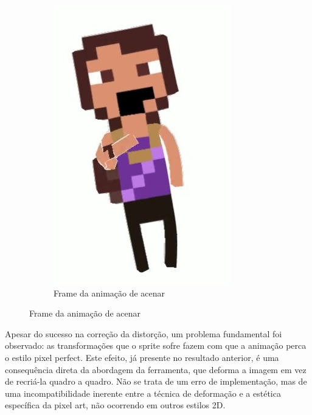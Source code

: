 \begin{figure}[htbp]
\begin{subfigure}{0.2\linewidth}
        \includegraphics[width=1\linewidth]{figs/sketchLab/irma2_frame4.jpg}
        \caption{\small Frame da animação de acenar}
        \label{fig:sketchIrma2Frame4}
    \end{subfigure}

\end{figure}

Apesar do sucesso na correção da distorção, um problema fundamental foi observado: as transformações que o sprite sofre fazem com que a animação perca o estilo pixel perfect. Este efeito, já presente no resultado anterior, é uma consequência direta da abordagem da ferramenta, que deforma a imagem em vez de recriá-la quadro a quadro. Não se trata de um erro de implementação, mas de uma incompatibilidade inerente entre a técnica de deformação e a estética específica da pixel art, não ocorrendo em outros estilos 2D.

